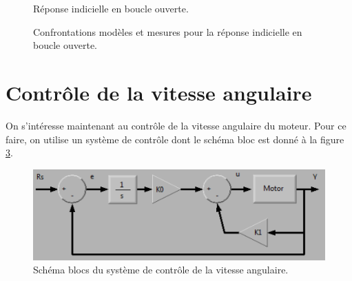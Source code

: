 \documentclass[frenchb, paper=a4, fontsize=11pt]{scrartcl}
\numberwithin{equation}{section}					%
\numberwithin{figure}{section}					%
\numberwithin{table}{section}						%
\begin{document}
\begin{figure}[ht]
	\centering
	
	\caption{Réponse indicielle en boucle ouverte.}
	\label{fig:open-loop-step-response}
\end{figure}

\begin{figure}[ht]
	\centering
	
	\caption{Confrontations modèles et mesures pour la réponse
	indicielle en boucle ouverte.}
	\label{fig:open-loop-step-response_model}
\end{figure}

\section{Contrôle de la vitesse angulaire}
On s'intéresse maintenant au contrôle de la vitesse angulaire
du moteur. Pour ce faire, on utilise un système de contrôle
dont le schéma bloc est donné à la figure
\ref{fig:block_diagram_angular_speed_control}.

\begin{figure}[ht]
	\centering
	\includegraphics[scale=0.7]{img/block_diagram_angular_speed_control.png}
	\caption{Schéma blocs du système de contrôle de la
	vitesse angulaire.}
	\label{fig:block_diagram_angular_speed_control}
\end{figure}
\end{document}
